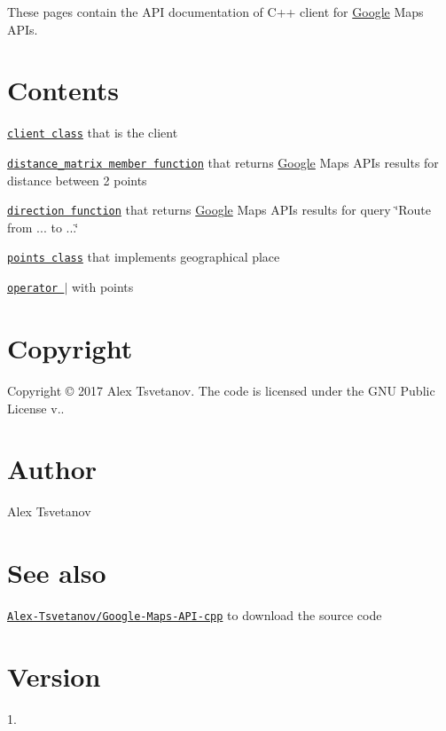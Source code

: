 \href{https://rawgit.com/Alex-Tsvetanov/Google-Maps-API-cpp/master/doc/html/index.html}{\tt } \href{https://github.com/Alex-Tsvetanov/Google-Maps-API-cpp/blob/master/LICENSE}{\tt } \href{https://github.com/Alex-Tsvetanov/Google-Maps-API-cpp/releases}{\tt } \href{http://github.com/Alex-Tsvetanov/Google-Maps-API-cpp/issues}{\tt } \href{http://isitmaintained.com/project/Alex-Tsvetanov/Google-Maps-API-cpp}{\tt } \href{https://bestpractices.coreinfrastructure.org/projects/980}{\tt }

These pages contain the A\+PI documentation of C++ client for \hyperlink{a00038}{Google} Maps A\+P\+Is.

\section*{Contents}


\begin{DoxyItemize}
\item \href{./a00047.html}{\tt client class} that is the client
\begin{DoxyItemize}
\item \href{./a00047.html#ac6a0c1904a585c4eb930c17e3dcf2ce9}{\tt distance\+\_\+matrix member function} that returns \hyperlink{a00038}{Google} Maps A\+P\+Is results for distance between 2 points
\item \href{./a00047.html#ac6a0c1904a585c4eb930c17e3dcf2ce9}{\tt direction function} that returns \hyperlink{a00038}{Google} Maps A\+P\+Is results for query \char`\"{}\+Route from ... to ...\char`\"{}
\end{DoxyItemize}
\item \href{./a00063.html}{\tt points class} that implements geographical place
\begin{DoxyItemize}
\item \href{./a00039.html}{\tt operator $\vert$} with points
\end{DoxyItemize}
\end{DoxyItemize}

\section*{Copyright}

Copyright © 2017 Alex Tsvetanov. The code is licensed under the G\+NU Public License v..

\section*{Author}

Alex Tsvetanov

\section*{See also}

\href{https://github.com/Alex-Tsvetanov/Google-Maps-API-cpp}{\tt Alex-\/\+Tsvetanov/\+Google-\/\+Maps-\/\+A\+P\+I-\/cpp} to download the source code

\section*{Version}

1. 